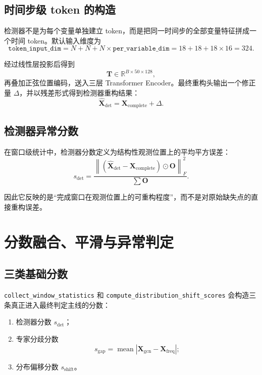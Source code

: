 \documentclass[UTF8]{ctexart}
\newcommand{\code}[1]{\texttt{#1}}
\begin{document}
\subsection{时间步级 token 的构造}

检测器不是为每个变量单独建立 token，而是把同一时间步的全部变量特征拼成一个时间 token。默认输入维度为
\begin{equation}
    \texttt{token\_input\_dim}
    =
    N + N + N \times \texttt{per\_variable\_dim}
    =
    18 + 18 + 18 \times 16
    = 324.
\end{equation}

经过线性层投影后得到
\begin{equation}
    \bm{T} \in \mathbb{R}^{B \times 50 \times 128},
\end{equation}
再叠加正弦位置编码，送入三层 Transformer Encoder。最终重构头输出一个修正量 \(\Delta\)，并以残差形式得到检测器重构结果：
\begin{equation}
    \widehat{\bm{X}}_{\text{det}} = \bm{X}_{\text{complete}} + \Delta.
\end{equation}

\subsection{检测器异常分数}

在窗口级统计中，检测器分数定义为结构性观测位置上的平均平方误差：
\begin{equation}
    s_{\text{det}}
    =
    \frac{
        \left\|
        (\widehat{\bm{X}}_{\text{det}} - \bm{X}_{\text{complete}})
        \odot \bm{O}
        \right\|_F^2
    }{
        \sum \bm{O}
    }.
\end{equation}

因此它反映的是“完成窗口在观测位置上的可重构程度”，而不是对原始缺失点的直接重构误差。

\section{分数融合、平滑与异常判定}

\subsection{三类基础分数}

\code{collect\_window\_statistics} 和 \code{compute\_distribution\_shift\_scores} 会构造三条真正进入最终判定主线的分数：
\begin{enumerate}
    \item 检测器分数 \(s_{\text{det}}\)；
    \item 专家分歧分数
    \begin{equation}
        s_{\text{gap}} = \operatorname{mean}\!\left|\bm{X}_{\text{gcn}}-\bm{X}_{\text{freq}}\right|;
    \end{equation}
    \item 分布偏移分数 \(s_{\text{shift}}\)。
\end{enumerate}
\end{document}
